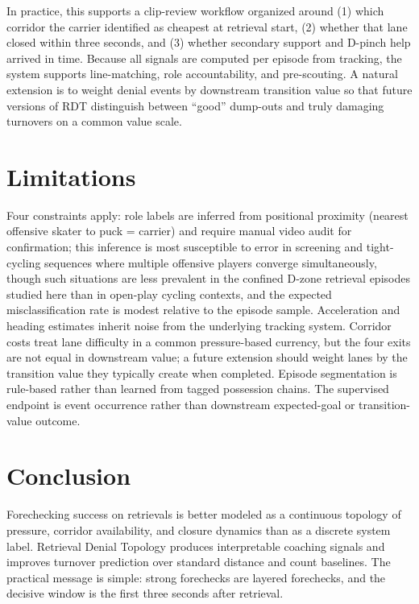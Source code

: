 \documentclass[10pt]{article}
\begin{document}
In practice, this supports a clip-review workflow organized around (1) which corridor the carrier identified as cheapest at retrieval start, (2) whether that lane closed within three seconds, and (3) whether secondary support and D-pinch help arrived in time. Because all signals are computed per episode from tracking, the system supports line-matching, role accountability, and pre-scouting. A natural extension is to weight denial events by downstream transition value so that future versions of RDT distinguish between ``good'' dump-outs and truly damaging turnovers on a common value scale.

\section{Limitations}
Four constraints apply: role labels are inferred from positional proximity (nearest offensive skater to puck = carrier) and require manual video audit for confirmation; this inference is most susceptible to error in screening and tight-cycling sequences where multiple offensive players converge simultaneously, though such situations are less prevalent in the confined D-zone retrieval episodes studied here than in open-play cycling contexts, and the expected misclassification rate is modest relative to the episode sample. Acceleration and heading estimates inherit noise from the underlying tracking system. Corridor costs treat lane difficulty in a common pressure-based currency, but the four exits are not equal in downstream value; a future extension should weight lanes by the transition value they typically create when completed. Episode segmentation is rule-based rather than learned from tagged possession chains. The supervised endpoint is event occurrence rather than downstream expected-goal or transition-value outcome.

\section{Conclusion}
Forechecking success on retrievals is better modeled as a continuous topology of pressure, corridor availability, and closure dynamics than as a discrete system label. Retrieval Denial Topology produces interpretable coaching signals and improves turnover prediction over standard distance and count baselines. The practical message is simple: strong forechecks are layered forechecks, and the decisive window is the first three seconds after retrieval.
\end{document}

